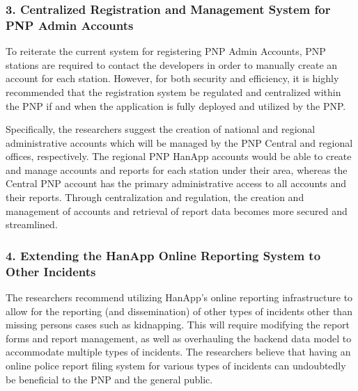 \subsubsection{3. Centralized Registration and Management System for PNP Admin Accounts}

To reiterate the current system for registering PNP Admin Accounts, PNP stations are required to contact the developers in order to manually create an account for each station. However, for both security and efficiency, it is highly recommended that the registration system be regulated and centralized within the PNP if and when the application is fully deployed and utilized by the PNP. 

Specifically, the researchers suggest the creation of national and regional administrative accounts which will be managed by the PNP Central and regional offices, respectively. The regional PNP HanApp accounts would be able to create and manage accounts and reports for each station under their area, whereas the Central PNP account has the primary administrative access to all accounts and their reports. Through centralization and regulation, the creation and management of accounts and retrieval of report data becomes more secured and streamlined.

\subsubsection{4. Extending the HanApp Online Reporting  System to Other Incidents}

The researchers recommend utilizing HanApp’s online reporting infrastructure to allow for the reporting (and dissemination) of other types of incidents other than missing persons cases such as kidnapping. This will require modifying the report forms and report management, as well as overhauling the backend data model to accommodate multiple types of incidents. The researchers believe that having an online police report filing system for various types of incidents can undoubtedly be beneficial to the PNP and the general public. 
